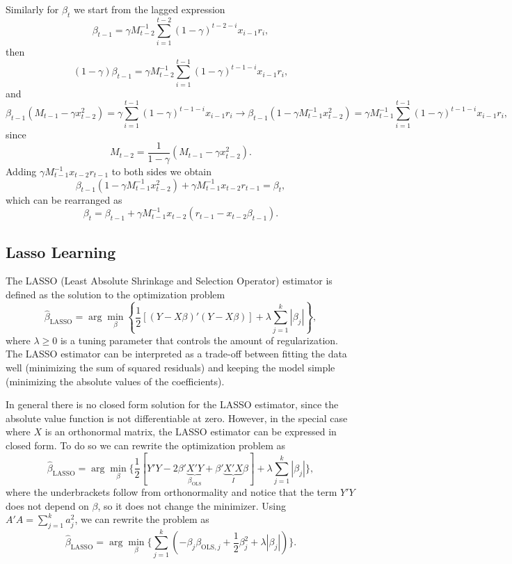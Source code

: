 \documentclass[11pt]{article}
\begin{document}
Similarly for $\beta_t$ we start from the lagged expression
\begin{equation}
    \beta_{t-1} = \gamma M^{-1}_{t-2} \sum^{t-2}_{i=1} {(1 - \gamma)^{t-2-i}} x_{i-1} r_i,
\end{equation}
then
\begin{equation}
    (1- \gamma) \beta_{t-1} = \gamma M^{-1}_{t-2} \sum^{t-1}_{i=1} {(1 - \gamma)^{t-1-i}} x_{i-1} r_i ,
\end{equation}
and
\begin{equation}
 \beta_{t-1} ( M_{t-1} - \gamma x_{t-2}^2) =  \gamma \sum^{t-1}_{i=1} {(1 - \gamma)^{t-1-i}} x_{i-1} r_i \rightarrow \beta_{t-1} (1 - \gamma M^{-1}_{t-1} x_{t-2}^2) = \gamma M^{-1}_{t-1} \sum^{t-1}_{i=1} {(1 - \gamma)^{t-1-i}} x_{i-1} r_i,
\end{equation}
since \[M_{t-2} = \frac{1}{1 - \gamma} (M_{t-1} - \gamma x_{t-2}^2).\]
Adding $\gamma M^{-1}_{t-1} x_{t-2} r_{t-1}$ to both sides we obtain
\begin{equation}
    \beta_{t-1} (1 - \gamma M^{-1}_{t-1} x_{t-2}^2) + \gamma M^{-1}_{t-1} x_{t-2} r_{t-1} = \beta_t,
\end{equation}
which can be rearranged as
\begin{equation}
    \beta_t = \beta_{t-1} + \gamma M^{-1}_{t-1} x_{t-2} (r_{t-1} - x_{t-2} \beta_{t-1}).
\end{equation}

\subsection{Lasso Learning}\label{app:lasso}
The LASSO (Least Absolute Shrinkage and Selection Operator) estimator is defined as the solution to the optimization problem
\[
\hat{\beta}_{\text{LASSO}} = \arg\min_{\beta} \left\{\frac{1}{2}\left[(Y - X\beta)'(Y - X\beta)\right] + \lambda \sum_{j=1}^{k} |\beta_j|\right\},
\]
where $\lambda \geq 0$ is a tuning parameter that controls the amount of regularization. The LASSO estimator can be interpreted as a trade-off between fitting the data well (minimizing the sum of squared residuals) and keeping the model simple (minimizing the absolute values of the coefficients).

In general there is no closed form solution for the LASSO estimator, since the absolute value function is not differentiable at zero. However, in the special case where $X$ is an orthonormal matrix, the LASSO estimator can be expressed in closed form.
To do so we can rewrite the optimization problem as
\[
\hat{\beta}_{\text{LASSO}} 
= \arg\min_{\beta} 
\Big\{ \frac{1}{2}\left[Y'Y - 2\beta'\underbrace{X'Y}_{\beta_{\text{OLS}}} 
+ \beta'\underbrace{X'X}_{I}\beta\right]
+ \lambda \sum_{j=1}^{k} |\beta_j| \Big\},
\]
where the underbrackets follow from orthonormality and notice that the term $Y'Y$ does not depend on $\beta$, so it does not change the minimizer.
Using $A'A = \sum_{j=1}^{k} a_j^2$, we can rewrite the problem as
\[
\hat{\beta}_{\text{LASSO}} = \arg\min_{\beta} \Big\{ \sum_{j=1}^{k} \left( -\beta_j \beta_{\text{OLS},j} + \frac{1}{2}\beta_j^2 + \lambda |\beta_j| \right) \Big\}.
\]
\end{document}
